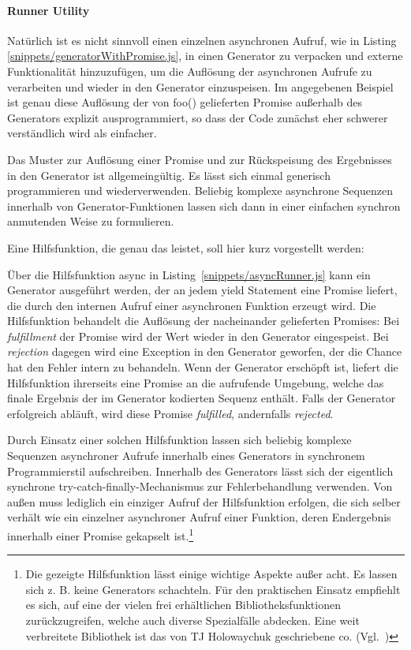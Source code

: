 \documentclass[
11pt, %
a4paper, %
oneside, %
pdfspacing, %
headinclude,
BCOR5mm, %
ngerman, %
bibtotocnumbered,
]{scrartcl}
\begin{document}
		\paragraph{Runner Utility}
		Natürlich ist es nicht sinnvoll einen einzelnen asynchronen Aufruf, wie in Listing \ref{snippets/generatorWithPromise.js}, in einen Generator zu verpacken und externe Funktionalität hinzuzufügen, um die Auflösung der asynchronen Aufrufe zu verarbeiten und wieder in den Generator einzuspeisen. Im angegebenen Beispiel ist genau diese Auflösung der von \textsf{foo()} gelieferten Promise außerhalb des Generators explizit ausprogrammiert, so dass der Code zunächst eher schwerer verständlich wird als einfacher.
		
		Das Muster zur Auflösung einer Promise und zur Rückspeisung des Ergebnisses in den Generator ist allgemeingültig. Es lässt sich einmal generisch programmieren und wiederverwenden. Beliebig komplexe asynchrone Sequenzen innerhalb von Generator-Funktionen lassen sich dann in einer einfachen synchron anmutenden Weise zu formulieren.
		
		Eine Hilfsfunktion, die genau das leistet, soll hier kurz vorgestellt werden:
		
		
		Über die Hilfsfunktion \textsf{async} in Listing~\ref{snippets/asyncRunner.js} kann ein Generator ausgeführt werden, der an jedem \textsf{yield} Statement eine Promise liefert, die durch den internen Aufruf einer asynchronen Funktion erzeugt wird. Die Hilfsfunktion behandelt die Auflösung der nacheinander gelieferten Promises: Bei \emph{fulfillment} der Promise wird der Wert wieder in den Generator eingespeist. Bei \emph{rejection} dagegen wird eine Exception in den Generator geworfen, der die Chance hat den Fehler intern zu behandeln. Wenn der Generator erschöpft ist, liefert die Hilfsfunktion ihrerseits eine Promise an die aufrufende Umgebung, welche das finale Ergebnis der im Generator kodierten Sequenz enthält. Falls der Generator erfolgreich abläuft, wird diese Promise \emph{fulfilled}, andernfalls \emph{rejected}.
		
		Durch Einsatz einer solchen Hilfsfunktion lassen sich beliebig komplexe Sequenzen asynchroner Aufrufe innerhalb eines Generators in synchronem Programmierstil aufschreiben. Innerhalb des Generators lässt sich der eigentlich synchrone \textsf{try-catch-finally}-Mechanismus zur Fehlerbehandlung verwenden. Von außen muss lediglich ein einziger Aufruf der Hilfsfunktion erfolgen, die sich selber verhält wie ein einzelner asynchroner Aufruf einer Funktion, deren Endergebnis innerhalb einer Promise gekapselt ist.\footnote{Die gezeigte Hilfsfunktion lässt einige wichtige Aspekte außer acht. Es lassen sich z. B. keine Generators schachteln. Für den praktischen Einsatz empfiehlt es sich, auf eine der vielen frei erhältlichen Bibliotheksfunktionen zurückzugreifen, welche auch diverse Spezialfälle abdecken. Eine weit verbreitete Bibliothek ist das von TJ Holowaychuk geschriebene \textsf{co}. (Vgl.~\citep{TJHolowaychuk.2013b})}
		
\end{document}
